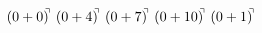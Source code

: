 \documentclass[preview]{standalone}
\begin{document}
\begin{align*}
(0+0)^{\hspace{-0.1cm}\urcorner} \ (0+4)^{\hspace{-0.1cm}\urcorner} \ (0+7)^{\hspace{-0.1cm}\urcorner} \ (0+10)^{\hspace{-0.1cm}\urcorner} \ (0+1)^{\hspace{-0.1cm}\urcorner}
\end{align*}
\end{document}
